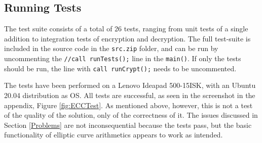 \subsection{Running Tests}
\label{RunTest}
The test suite consists of a total of 26 tests, ranging from unit tests of a single addition to integration tests of encryption and decryption. The full test-suite is included in the source code in the \texttt{src.zip} folder, and can be run by uncommenting the \texttt{//call runTests();} line in the \texttt{main()}. If only the tests should be run, the line with \texttt{call runCrypt();} needs to be uncommented. 

The tests have been performed on a Lenovo Ideapad 500-15ISK, with an Ubuntu 20.04 distribution as OS. All tests are successful, as seen in the screenshot in the appendix, Figure \ref{fig:ECCTest}. As mentioned above, however, this is not a test of the quality of the solution, only of the correctness of it. The issues discussed in Section \ref{Problems} are not inconsequential because the tests pass, but the basic functionality of elliptic curve arithmetics appears to work as intended. 